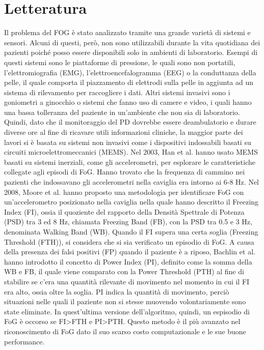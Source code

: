 



\chapter{Letteratura}\label{chap2:related}
Il problema del FOG è stato analizzato tramite una grande varietà di sistemi e sensori. Alcuni di questi, però, non sono utilizzabili durante la vita quotidiana dei pazienti poiché posso essere disponibili solo in ambienti di laboratorio. Esempi di questi sistemi sono le piattaforme di pressione\cite{38}, le quali sono non portatili, l'elettromiografia (EMG)\cite{25}, l'elettroencefalogramma (EEG)\cite{42} o la conduttanza della pelle\cite{43}, il quale comporta il piazzamento di elettrodi sulla pelle in aggiunta ad un sistema di rilevamento per raccogliere i dati.
Altri sistemi invasivi sono i goniometri a ginocchio\cite{23} o sistemi che fanno uso di camere e video, i quali hanno una bassa tolleranza del paziente in un'ambiente che non sia di laboratorio\cite{23,39,44}. Quindi, dato che il monitoraggio del PD dovrebbe essere deambulatorio e  durare diverse ore al fine di ricavare utili informazioni cliniche\cite{34,45}, la maggior parte dei lavori si è basata su sistemi non invasivi come i dispositivi indossabili basati su circuiti microelettromeccanici (MEMS). \newline
Nel 2003, Han et al. hanno usato MEMS basati su sistemi inerziali, come gli accelerometri, per esplorare le caratteristiche collegate agli episodi di FoG. Hanno trovato che la frequenza di cammino nei pazienti che indossavano gli accelerometri nella caviglia era intorno ai 6-8 Hz\cite{19}. Nel 2008, Moore et al. hanno proposto una metodologia per identificare FoG con un'accelerometro posizionato nella caviglia nella quale hanno descritto il Freezing Index (FI), ossia il quoziente del rapporto della Densità Spettrale di Potenza (PSD) tra 3 ed 8 Hz, chiamata Freezing Band (FB), con la PSD tra 0.5 e 3 Hz, denominata Walking Band (WB)\cite{21}. Quando il FI supera una certa soglia (Freezing Threshold (FTH)), si considera che si sia verificato un episodio di FoG. A causa della presenza dei falsi positivi (FP) quando il paziente è a riposo, Bachlin et al. hanno introdotto il concetto di Power Index (PI), definito come la somma della WB e FB, il quale viene comparato con la Power Threshold (PTH) al fine di stabilire se c'era una quantità rilevante di movimento nel momento in cui il FI era alto, ossia oltre la soglia\cite{21}. PI indica la quantità di movimento, perciò situazioni nelle quali il paziente non si stesse muovendo volontariamente sono state eliminate. In quest'ultima versione dell'algoritmo, quindi, un espisodio di FoG è occorso se FI>FTH e PI>PTH. Questo metodo è il più avanzato nel riconoscimento di FoG dato il suo scarso costo computazionale e le sue buone performance\cite{22}. \newline
